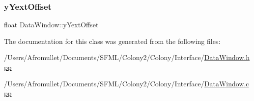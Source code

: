 \mbox{\label{class_data_window_a6cd46170662797b4c05558b524606de3}} 
\subsubsection{\texorpdfstring{y\+Yext\+Offset}{yYextOffset}}
{\footnotesize\ttfamily float Data\+Window\+::y\+Yext\+Offset\hspace{0.3cm}{\ttfamily [private]}}



The documentation for this class was generated from the following files\+:\begin{DoxyCompactItemize}
\item 
/\+Users/\+Afromullet/\+Documents/\+S\+F\+M\+L/\+Colony2/\+Colony/\+Interface/\mbox{\hyperlink{_data_window_8hpp}{Data\+Window.\+hpp}}\item 
/\+Users/\+Afromullet/\+Documents/\+S\+F\+M\+L/\+Colony2/\+Colony/\+Interface/\mbox{\hyperlink{_data_window_8cpp}{Data\+Window.\+cpp}}\end{DoxyCompactItemize}
